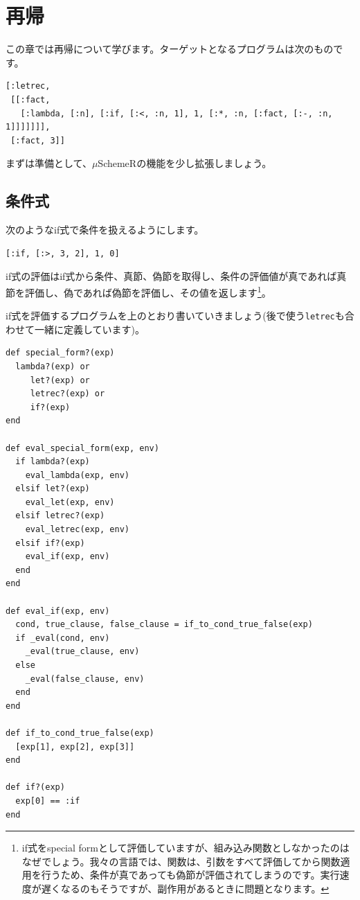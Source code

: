 \chapter{再帰\hspace{-3mm}}

この章では再帰について学びます。ターゲットとなるプログラムは次のものです。

\begin{lstlisting}
[:letrec, 
 [[:fact,
   [:lambda, [:n], [:if, [:<, :n, 1], 1, [:*, :n, [:fact, [:-, :n, 1]]]]]]], 
 [:fact, 3]]
\end{lstlisting}

まずは準備として、$\mu$SchemeRの機能を少し拡張しましょう。

\section{条件式}

次のようなif式で条件を扱えるようにします。

\begin{lstlisting}
[:if, [:>, 3, 2], 1, 0]
\end{lstlisting}

if式の評価はif式から条件、真節、偽節を取得し、条件の評価値が真であれば真節を評価し、偽であれば偽節を評価し、その値を返します\footnote{if式をspecial formとして評価していますが、組み込み関数としなかったのはなぜでしょう。我々の言語では、関数は、引数をすべて評価してから関数適用を行うため、条件が真であっても偽節が評価されてしまうのです。実行速度が遅くなるのもそうですが、副作用があるときに問題となります。}。

if式を評価するプログラムを上のとおり書いていきましょう(後で使う{\tt letrec}も合わせて一緒に定義しています)。

\begin{lstlisting}
def special_form?(exp)
  lambda?(exp) or 
     let?(exp) or 
     letrec?(exp) or 
     if?(exp)
end

def eval_special_form(exp, env)
  if lambda?(exp)
    eval_lambda(exp, env)
  elsif let?(exp)
    eval_let(exp, env)
  elsif letrec?(exp)
    eval_letrec(exp, env)
  elsif if?(exp)
    eval_if(exp, env)
  end
end

def eval_if(exp, env)
  cond, true_clause, false_clause = if_to_cond_true_false(exp)
  if _eval(cond, env)
    _eval(true_clause, env)
  else
    _eval(false_clause, env)
  end
end

def if_to_cond_true_false(exp)
  [exp[1], exp[2], exp[3]]
end

def if?(exp)
  exp[0] == :if
end
\end{lstlisting}


